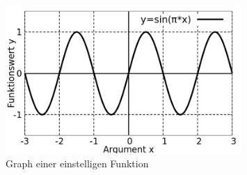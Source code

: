 \begin{figure}[h]
    \caption{Graph einer einstelligen Funktion}
    \label{fig:GraphUnivarFun}
    \centering
    \includegraphics[width=0.8\textwidth]{./gnuplot/example-univariate-function.png}
\end{figure}

